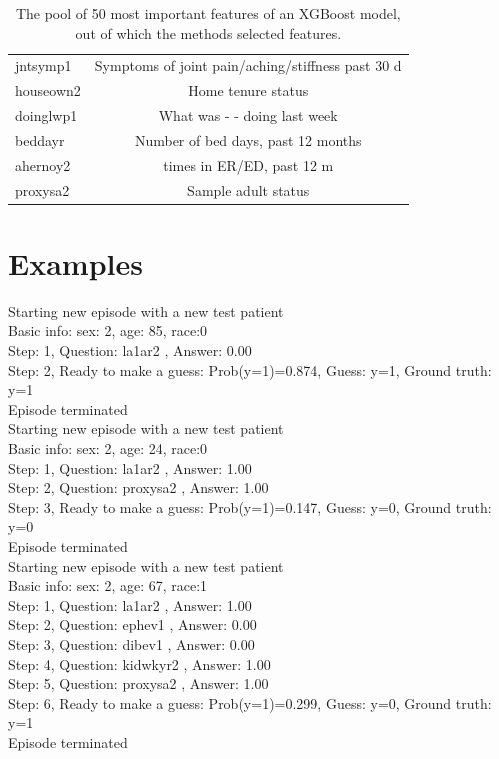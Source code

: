 \documentclass[reqno,11pt]{article}
\begin{document}
\begin{table}[h!]
\begin{tabular}{|| l | c ||}
jntsymp1  & Symptoms of joint pain/aching/stiffness past 30 d \\ [0.5ex] 
houseown2 & Home tenure status \\ [0.5ex] 
doinglwp1  & What was - - doing last week \\ [0.5ex] 
beddayr  & Number of bed days, past 12 months \\ [0.5ex] 
ahernoy2 & times in ER/ED, past 12 m \\ [0.5ex] 
proxysa2 & Sample adult status \\ [0.5ex] 
 \hline
\end{tabular}
\caption{The pool of 50 most important features of an XGBoost model, out of which the methods selected features.}
\label{tab:features}
\end{table}

\section {Examples}\label{app:examples}

\noindent Starting new episode with a new test patient \\ [0.5ex] 
Basic info: sex: 2, age: 85, race:0 \\ [0.5ex] 
Step: 1, Question:  la1ar2 , Answer: 0.00 \\ [0.5ex] 
Step: 2, Ready to make a guess: Prob(y=1)=0.874, Guess: y=1, Ground truth: y=1 \\ [0.5ex] 
Episode terminated \\ [0.5ex] 

\noindent Starting new episode with a new test patient \\ [0.5ex] 
Basic info: sex: 2, age: 24, race:0 \\ [0.5ex] 
Step: 1, Question:  la1ar2 , Answer: 1.00 \\ [0.5ex] 
Step: 2, Question:  proxysa2 , Answer: 1.00 \\ [0.5ex] 
Step: 3, Ready to make a guess: Prob(y=1)=0.147, Guess: y=0, Ground truth: y=0 \\ [0.5ex] 
Episode terminated \\ [0.5ex] 

\noindent Starting new episode with a new test patient \\ [0.5ex] 
Basic info: sex: 2, age: 67, race:1 \\ [0.5ex] 
Step: 1, Question:  la1ar2 , Answer: 1.00 \\ [0.5ex] 
Step: 2, Question:  ephev1 , Answer: 0.00 \\ [0.5ex] 
Step: 3, Question:  dibev1 , Answer: 0.00 \\ [0.5ex] 
Step: 4, Question:  kidwkyr2 , Answer: 1.00 \\ [0.5ex] 
Step: 5, Question:  proxysa2 , Answer: 1.00 \\ [0.5ex] 
Step: 6, Ready to make a guess: Prob(y=1)=0.299, Guess: y=0, Ground truth: y=1 \\ [0.5ex] 
Episode terminated \\ [0.5ex] 
\end{document}
